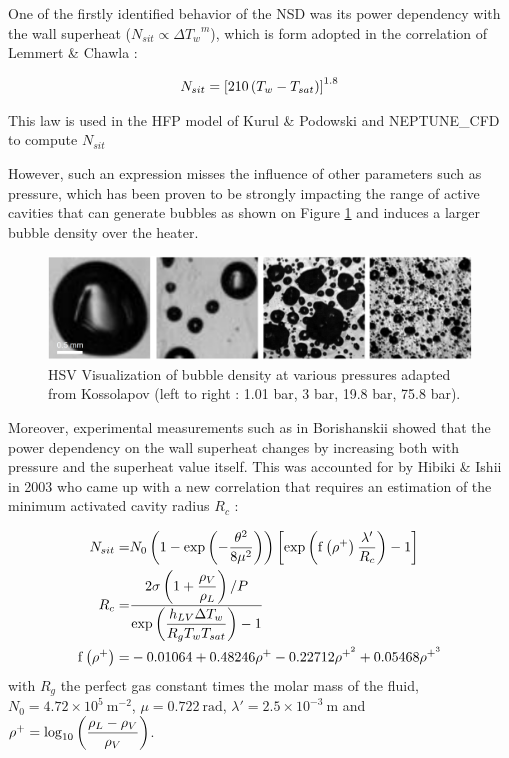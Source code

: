 \npar

One of the firstly identified behavior of the NSD was its power dependency with the wall superheat ($N_{sit} \propto {\Delta T_{w}}^{m}$), which is form adopted in the correlation of Lemmert \& Chawla \cite{Lemmert} : 

\begin{align}
N_{sit}=\left[ 210\left( T_{w}-T_{sat} \right) \right]^{1.8}
\label{eq:nsit_lemmert}
\end{align}

\begin{remark*}{}
This law is used in the HFP model of Kurul \& Podowski and NEPTUNE\_CFD to compute $N_{sit}$
\end{remark*}

However, such an expression misses the influence of other parameters such as pressure, which has been proven to be strongly impacting the range of active cavities that can generate bubbles as shown on Figure \ref{fig:nsd_P_koss} and induces a larger bubble density over the heater. 

\begin{figure}
\centering
\includegraphics[width=0.7\linewidth]{img/NSD/nsd_press_koss.png}
\caption{HSV Visualization of bubble density at various pressures adapted from Kossolapov \cite{kossolapov_experimental_2021} (left to right : 1.01 bar, 3 bar, 19.8 bar, 75.8 bar). }
\label{fig:nsd_P_koss}
\end{figure}

\npar

Moreover, experimental measurements such as in Borishanskii \cite{Borishanskii} showed that the power dependency on the wall superheat changes by increasing both with pressure and the superheat value itself. This was accounted for by Hibiki \& Ishii in 2003 \cite{hibiki_ishii} who came up with a new correlation that requires an estimation of the minimum activated cavity radius $R_{c}$ : 


\begin{align}
N_{sit} =& N_{0}\parth{1-\exp{-\dfrac{\theta^{2}}{8\mu^{2}} } }\crocht{\exp{ \mathrm{f}\parth{\rho^{+}}\dfrac{\lambda '}{R_{c}} } -1}
\label{eq:nsit_hibiki} \\
%
R_{c} =& \dfrac{2\sigma\parth{1+\dfrac{\rho_{V}}{\rho_{L}}} / P }{\exp{\dfrac{h_{LV} \Delta T_{w}}{R_{g}T_{w}T_{sat}} } -1}\\
%
\mathrm{f}\parth{\rho^{+}} =& -0.01064 + 0.48246\rho^{+} - 0.22712 \rho^{+^{2}} + 0.05468 \rho^{+^{3}}
\end{align}
with $R_{g}$ the perfect gas constant times the molar mass of the fluid,  $N_{0}=4.72\times 10^{5}\ \mathrm{m}^{-2}$, $\mu = 0.722\ \mathrm{rad}$, $\lambda ' = 2.5 \times 10^{-3} \ \mathrm{m}$ and $\rho^{+}=\mathrm{log}_{10}\left( \dfrac{\rho_{L}-\rho_{V}}{\rho_{V}} \right)$.


